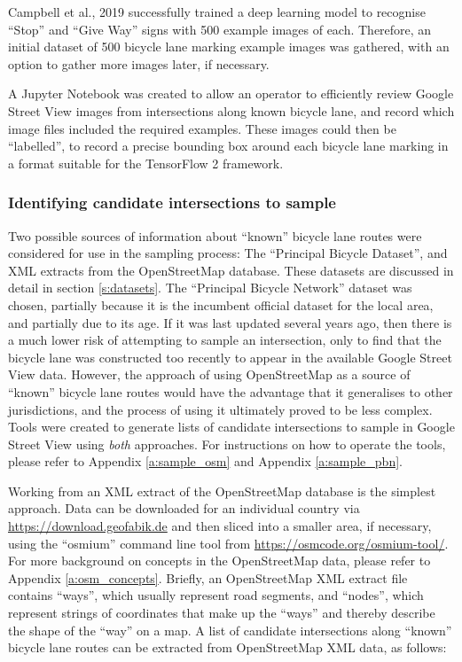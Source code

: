 \documentclass[11pt,twoside]{report}
\begin{document}
Campbell et al., 2019 \cite{CAMPBELL2019101350} successfully trained a deep learning model to recognise ``Stop'' and ``Give Way'' signs with 500 example images of each.  Therefore, an initial dataset of 500 bicycle lane marking example images was gathered, with an option to gather more images later, if necessary.

A Jupyter Notebook was created to allow an operator to efficiently review Google Street View images from intersections along known bicycle lane, and record which image files included the required examples.  These images could then be ``labelled'', to record a precise bounding box around each bicycle lane marking in a format suitable for the TensorFlow 2 framework.

\subsubsection{Identifying candidate intersections to sample}
\label{s:sample_candidates}

Two possible sources of information about ``known'' bicycle lane routes were considered for use in the sampling process:  The ``Principal Bicycle Dataset'', and XML extracts from the OpenStreetMap database.  These datasets are discussed in detail in section \ref{s:datasets}.  The ``Principal Bicycle Network'' dataset was chosen, partially because it is the incumbent official dataset for the local area, and partially due to its age.  If it was last updated several years ago, then there is a much lower risk of attempting to sample an intersection, only to find that the bicycle lane was constructed too recently to appear in the available Google Street View data.  However, the approach of using OpenStreetMap as a source of ``known'' bicycle lane routes would have the advantage that it generalises to other jurisdictions, and the process of using it ultimately proved to be less complex.  Tools were created to generate lists of candidate intersections to sample in Google Street View using \textit{both} approaches.  For instructions on how to operate the tools, please refer to Appendix \ref{a:sample_osm} and Appendix \ref{a:sample_pbn}.

Working from an XML extract of the OpenStreetMap database is the simplest approach.  Data can be downloaded for an individual country via \url{https://download.geofabik.de} and then sliced into a smaller area, if necessary, using the ``osmium'' command line tool from \url{https://osmcode.org/osmium-tool/}.  For more background on concepts in the OpenStreetMap data, please refer to Appendix \ref{a:osm_concepts}.  Briefly, an OpenStreetMap XML extract file contains ``ways'', which usually represent road segments, and ``nodes'', which represent strings of coordinates that make up the ``ways'' and thereby describe the shape of the ``way'' on a map.  A list of candidate intersections along ``known'' bicycle lane routes can be extracted from OpenStreetMap XML data, as follows:
\end{document}
